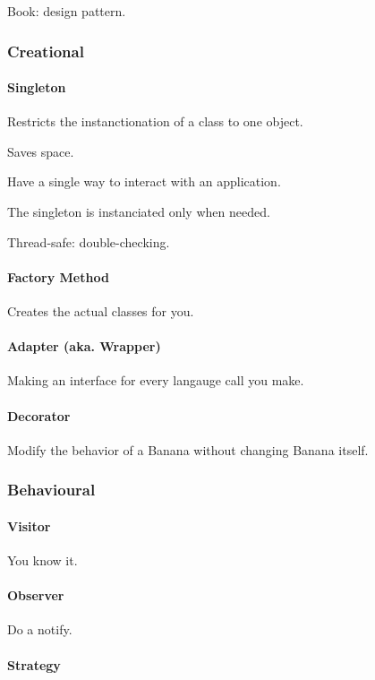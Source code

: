 \documentclass[a4paper,11pt]{article}
\begin{document}
Book: design pattern.

\subsubsection{Creational}

\paragraph{Singleton}

Restricts the instanctionation of a class to one object.

Saves space.

Have a single way to interact with an application.

The singleton is instanciated only when needed.

Thread-safe: double-checking.

\paragraph{Factory Method}

Creates the actual classes for you.

\paragraph{Adapter (aka. Wrapper)}

Making an interface for every langauge call you make.

\paragraph{Decorator}

Modify the behavior of a Banana without changing Banana itself.

\subsubsection{Behavioural}

\paragraph{Visitor}

You know it.

\paragraph{Observer}

Do a notify.

\paragraph{Strategy}
\end{document}
